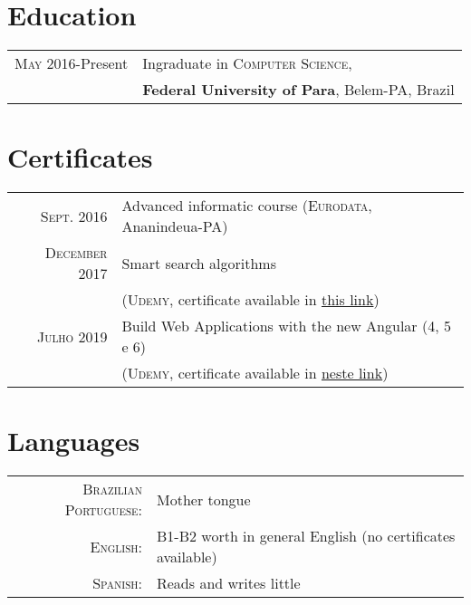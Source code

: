 \documentclass[a4paper,10pt]{article}
\begin{document}
\section{Education}
\begin{tabular}{rl}	
 \textsc{May} 2016-Present & Ingraduate in \textsc{Computer Science}, \\
& \textbf{Federal University of Para}, Belem-PA, Brazil
\end{tabular}

\section{Certificates}
\begin{tabular}{rl}
 \textsc{Sept.} 2016 & Advanced informatic course (\textsc{Eurodata}, Ananindeua-PA)\\
\textsc{December} 2017 & Smart search algorithms\\ & (\textsc{Udemy}, \footnotesize{certificate available in \href{https://www.udemy.com/certificate/UC-9414I0UR/}{this link}})\\
\textsc{Julho} 2019 &  Build Web Applications with the new Angular (4, 5 e 6)\\ & (\textsc{Udemy}, \footnotesize{certificate available in \href{https://www.udemy.com/certificate/UC-P6VGWTET/}{neste link}})
\end{tabular}

\section{Languages}
\begin{tabular}{rl}
 \textsc{Brazilian Portuguese:}& Mother tongue\\
\textsc{English:}&B1-B2 worth in general English (no certificates available)\\
\textsc{Spanish:}&Reads and writes little\\
\end{tabular}
\end{document}
